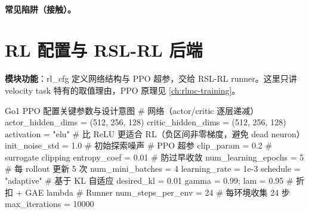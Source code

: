 \paragraph{常见陷阱（接触）。}


\begin{practice}[接触传感]
\end{practice}

\section{RL 配置与 RSL-RL 后端}
\label{sec:rlmc-ql-rlcfg}

\textbf{模块功能}：rl\_cfg 定义网络结构与 PPO 超参，交给 RSL-RL runner。这里只讲 velocity task 特有的取值理由，PPO 原理见 \cref{ch:rlmc-training}。

\begin{codebox}[Python]{Go1 PPO 配置关键参数与设计意图}
# 网络（actor/critic 逐层递减）
actor_hidden_dims  = (512, 256, 128)
critic_hidden_dims = (512, 256, 128)
activation   = "elu"      # 比 ReLU 更适合 RL（负区间非零梯度，避免 dead neuron）
init_noise_std = 1.0      # 初始探索噪声
# PPO 超参
clip_param = 0.2          # surrogate clipping
entropy_coef = 0.01       # 防过早收敛
num_learning_epochs = 5   # 每 rollout 更新 5 次
num_mini_batches = 4
learning_rate = 1e-3
schedule = "adaptive"     # 基于 KL 自适应
desired_kl = 0.01
gamma = 0.99; lam = 0.95  # 折扣 + GAE lambda
# Runner
num_steps_per_env = 24    # 每环境收集 24 步
max_iterations = 10000
\end{codebox}

